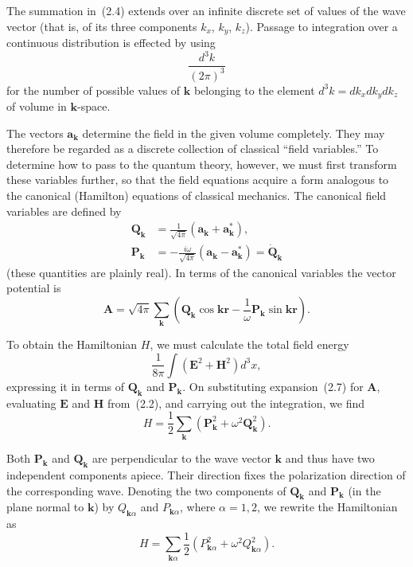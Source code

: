 The summation in~(2.4) extends over an infinite discrete set of values of the wave vector (that is, of its three components $k_x$, $k_y$, $k_z$). Passage to integration over a continuous distribution is effected by using
\[
\frac{d^3k}{(2\pi)^3}
\]
for the number of possible values of $\mathbf{k}$ belonging to the element $d^3k=dk_xdk_ydk_z$ of volume in $\mathbf{k}$-space.

The vectors $\mathbf{a}_{\mathbf{k}}$ determine the field in the given volume completely. They may therefore be regarded as a discrete collection of classical ``field variables.'' To determine how to pass to the quantum theory, however, we must first transform these variables further, so that the field equations acquire a form analogous to the canonical (Hamilton) equations of classical mechanics. The canonical field variables are defined by
\begin{equation}
\begin{aligned}
\mathbf{Q}_{\mathbf{k}}&=\frac{1}{\sqrt{4\pi}}\left(\mathbf{a}_{\mathbf{k}}+\mathbf{a}_{\mathbf{k}}^*\right),\\
\mathbf{P}_{\mathbf{k}}&=-\frac{i\omega}{\sqrt{4\pi}}\left(\mathbf{a}_{\mathbf{k}}-\mathbf{a}_{\mathbf{k}}^*\right)=\dot{\mathbf{Q}}_{\mathbf{k}}
\end{aligned}
\tag{2.6}
\end{equation}
(these quantities are plainly real). In terms of the canonical variables the vector potential is
\begin{equation}
\mathbf{A}=\sqrt{4\pi}\sum_{\mathbf{k}}\left(\mathbf{Q}_{\mathbf{k}}\cos\mathbf{kr}-\frac{1}{\omega}\mathbf{P}_{\mathbf{k}}\sin\mathbf{kr}\right).
\tag{2.7}
\end{equation}

To obtain the Hamiltonian $H$, we must calculate the total field energy
\[
\frac{1}{8\pi}\int\left(\mathbf{E}^2+\mathbf{H}^2\right)d^3x,
\]
expressing it in terms of $\mathbf{Q}_{\mathbf{k}}$ and $\mathbf{P}_{\mathbf{k}}$. On substituting expansion~(2.7) for $\mathbf{A}$, evaluating $\mathbf{E}$ and $\mathbf{H}$ from~(2.2), and carrying out the integration, we find
\[
H=\frac{1}{2}\sum_{\mathbf{k}}\left(\mathbf{P}_{\mathbf{k}}^2+\omega^2\mathbf{Q}_{\mathbf{k}}^2\right).
\]

Both $\mathbf{P}_{\mathbf{k}}$ and $\mathbf{Q}_{\mathbf{k}}$ are perpendicular to the wave vector $\mathbf{k}$ and thus have two independent components apiece. Their direction fixes the polarization direction of the corresponding wave. Denoting the two components of $\mathbf{Q}_{\mathbf{k}}$ and $\mathbf{P}_{\mathbf{k}}$ (in the plane normal to $\mathbf{k}$) by $Q_{\mathbf{k}\alpha}$ and $P_{\mathbf{k}\alpha}$, where $\alpha=1,2$, we rewrite the Hamiltonian as
\begin{equation}
H=\sum_{\mathbf{k}\alpha}\frac{1}{2}\left(P_{\mathbf{k}\alpha}^2+\omega^2Q_{\mathbf{k}\alpha}^2\right).
\tag{2.8}
\end{equation}

